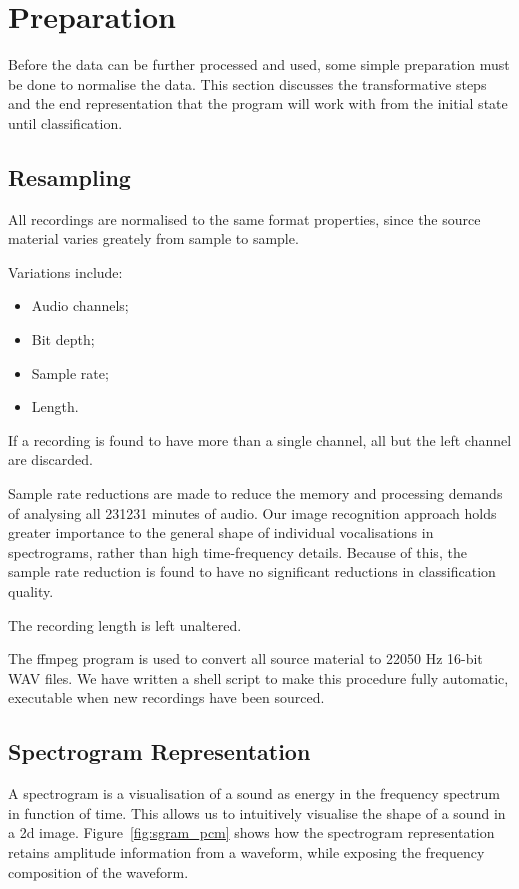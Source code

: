 \section{Preparation}\label{sec:prep}
Before the data can be further processed and used, some simple preparation
must be done to normalise the data.
This section discusses the transformative steps and the end representation that
the program will work with from the initial state until classification.

\subsection{Resampling}
All recordings are normalised to the same format properties, since the source
material varies greately from sample to sample.

Variations include:
\begin{itemize}[noitemsep]
  \item Audio channels;
  \item Bit depth;
  \item Sample rate;
  \item Length.
\end{itemize}

If a recording is found to have more than a single channel, all but the left
channel are discarded.

Sample rate reductions are made to reduce the memory and processing demands of
analysing all 231231 minutes of audio.
Our image recognition approach holds greater importance to the general shape
of individual vocalisations in spectrograms, rather than high time-frequency
details.
Because of this, the sample rate reduction is found to have no significant
reductions in classification quality.

The recording length is left unaltered.

The ffmpeg program is used to convert all source material to 22050 Hz 16-bit
WAV files.
We have written a shell script to make this procedure fully automatic, executable
when new recordings have been sourced.


\subsection{Spectrogram Representation}
A spectrogram is a visualisation of a sound as energy in the frequency spectrum
in function of time.
This allows us to intuitively visualise the shape of a sound in a 2d image.
Figure~\ref{fig:sgram_pcm} shows how the spectrogram representation retains
amplitude information from a waveform, while exposing the frequency composition
of the waveform.

